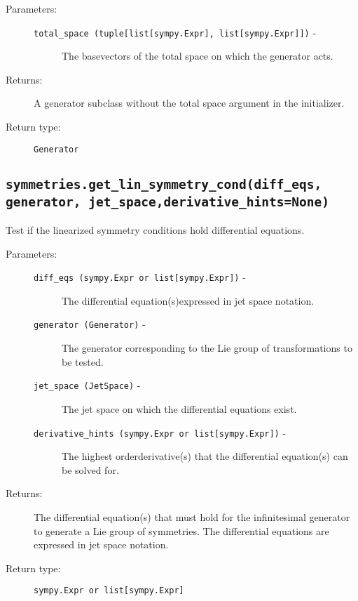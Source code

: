    \begin{description}
      \item[Parameters:] \leavevmode
        \begin{description}
            \item[\lstinline{total_space (tuple[list[sympy.Expr], list[sympy.Expr]])} -] The base\newline vectors of the total space on which the generator acts.
        \end{description}
      \item[Returns:] A generator subclass without the total space argument in the initializer.
      \item[Return type:] \lstinline{Generator}
   \end{description}

\subsection*{\lstinline{symmetries.get_lin_symmetry_cond(diff_eqs, generator, jet_space,}\newline\lstinline{derivative_hints=None)}}

   Test if the linearized symmetry conditions hold differential
   equations.

   \begin{description}
      \item[Parameters:] \leavevmode
        \begin{description}
            \item[\lstinline{diff_eqs (sympy.Expr or list[sympy.Expr])} -] The differential equation(s)\newline expressed in jet space notation.
            \item[\lstinline{generator (Generator)} -] The generator corresponding to the Lie group of transformations to be tested.
            \item[\lstinline{jet_space (JetSpace)} -] The jet space on which the differential equations exist.
            \item[\lstinline{derivative_hints (sympy.Expr or list[sympy.Expr])} -] The highest order\newline derivative(s) that the differential equation(s) can be solved for.
        \end{description}

      \item[Returns:] The differential equation(s) that must hold for the infinitesimal generator to generate a Lie group of symmetries. The differential equations are expressed in jet space notation.
      \item[Return type:] \lstinline{sympy.Expr or list[sympy.Expr]}
   \end{description}

